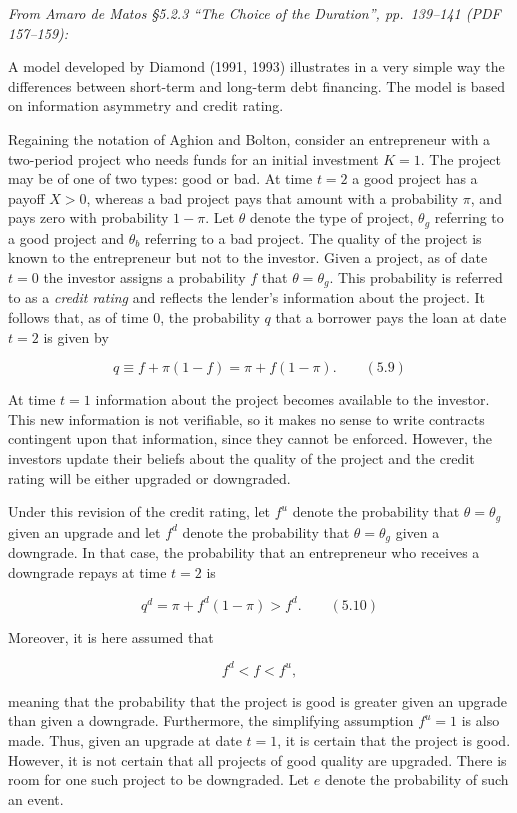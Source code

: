 \documentclass[11pt,a4paper]{article}
\begin{document}
\emph{From Amaro de Matos §5.2.3 ``The Choice of the Duration'', pp.~139--141 (PDF 157--159):}

A model developed by Diamond (1991, 1993) illustrates in a very simple way the differences between
short-term and long-term debt financing. The model is based on information asymmetry and credit
rating.

Regaining the notation of Aghion and Bolton, consider an entrepreneur with a two-period project who
needs funds for an initial investment \(K = 1\). The project may be of one of two types: good or
bad. At time \(t = 2\) a good project has a payoff \(X > 0\), whereas a bad project pays that amount
with a probability \(\pi\), and pays zero with probability \(1 - \pi\). Let \(\theta\) denote the
type of project, \(\theta_g\) referring to a good project and \(\theta_b\) referring to a bad
project. The quality of the project is known to the entrepreneur but not to the investor. Given a
project, as of date \(t = 0\) the investor assigns a probability \(f\) that \(\theta = \theta_g\).
This probability is referred to as a \emph{credit rating} and reflects the lender's information
about the project. It follows that, as of time 0, the probability \(q\) that a borrower pays the
loan at date \(t = 2\) is given by

\[q \equiv f + \pi(1 - f) = \pi + f(1 - \pi). \qquad (5.9)\]

At time \(t = 1\) information about the project becomes available to the investor. This new
information is not verifiable, so it makes no sense to write contracts contingent upon that
information, since they cannot be enforced. However, the investors update their beliefs about the
quality of the project and the credit rating will be either upgraded or downgraded.

Under this revision of the credit rating, let \(f^u\) denote the probability that
\(\theta = \theta_g\) given an upgrade and let \(f^d\) denote the probability that
\(\theta = \theta_g\) given a downgrade. In that case, the probability that an entrepreneur who
receives a downgrade repays at time \(t = 2\) is

\[q^d = \pi + f^d(1 - \pi) > f^d. \qquad (5.10)\]

Moreover, it is here assumed that

\[f^d < f < f^u,\]

meaning that the probability that the project is good is greater given an upgrade than given a
downgrade. Furthermore, the simplifying assumption \(f^u = 1\) is also made. Thus, given an upgrade
at date \(t = 1\), it is certain that the project is good. However, it is not certain that all
projects of good quality are upgraded. There is room for one such project to be downgraded. Let
\(e\) denote the probability of such an event.
\end{document}
